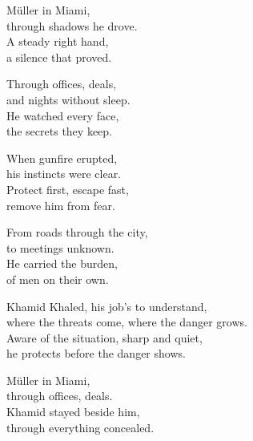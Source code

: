 \begin{lyrics}
Müller in Miami,\\
through shadows he drove.\\
A steady right hand,\\
a silence that proved.

Through offices, deals,\\
and nights without sleep.\\
He watched every face,\\
the secrets they keep.

When gunfire erupted,\\
his instincts were clear.\\
Protect first, escape fast,\\
remove him from fear.

From roads through the city,\\
to meetings unknown.\\
He carried the burden,\\
of men on their own.

Khamid Khaled, his job's to understand,\\
where the threats come, where the danger grows.\\
Aware of the situation, sharp and quiet,\\
he protects before the danger shows.

Müller in Miami,\\
through offices, deals.\\
Khamid stayed beside him,\\
through everything concealed.
\end{lyrics}

